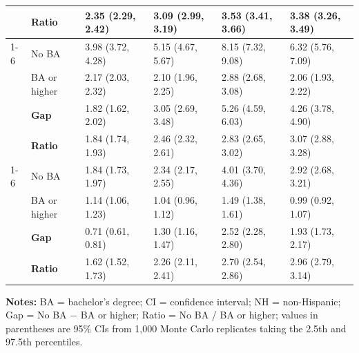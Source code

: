 \begin{threeparttable}
\begin{tabular}{llllll}
 & \textbf{Ratio} & 2.35 (2.29, 2.42) & 3.09 (2.99, 3.19) & 3.53 (3.41, 3.66) & 3.38 (3.26, 3.49) \\
\cmidrule(lr){1-6}
\multirow{4}{*}{NH Black} & No BA & 3.98 (3.72, 4.28) & 5.15 (4.67, 5.67) & 8.15 (7.32, 9.08) & 6.32 (5.76, 7.09) \\
 & BA or higher & 2.17 (2.03, 2.32) & 2.10 (1.96, 2.25) & 2.88 (2.68, 3.08) & 2.06 (1.93, 2.22) \\
 & \textbf{Gap} & 1.82 (1.62, 2.02) & 3.05 (2.69, 3.48) & 5.26 (4.59, 6.03) & 4.26 (3.78, 4.90) \\
 & \textbf{Ratio} & 1.84 (1.74, 1.93) & 2.46 (2.32, 2.61) & 2.83 (2.65, 3.02) & 3.07 (2.88, 3.28) \\
\cmidrule(lr){1-6}
\multirow{4}{*}{Hispanic} & No BA & 1.84 (1.73, 1.97) & 2.34 (2.17, 2.55) & 4.01 (3.70, 4.36) & 2.92 (2.68, 3.21) \\
 & BA or higher & 1.14 (1.06, 1.23) & 1.04 (0.96, 1.12) & 1.49 (1.38, 1.61) & 0.99 (0.92, 1.07) \\
 & \textbf{Gap} & 0.71 (0.61, 0.81) & 1.30 (1.16, 1.47) & 2.52 (2.28, 2.80) & 1.93 (1.73, 2.17) \\
 & \textbf{Ratio} & 1.62 (1.52, 1.73) & 2.26 (2.11, 2.41) & 2.70 (2.54, 2.86) & 2.96 (2.79, 3.14) \\
\bottomrule
\end{tabular}
\begin{tablenotes}[flushleft]
\small
\item \textbf{Notes:} BA = bachelor's degree; CI = confidence interval; NH = non-Hispanic; Gap = No BA $-$ BA or higher; Ratio = No BA / BA or higher; values in parentheses are 95\% CIs from 1,000 Monte Carlo replicates taking the 2.5th and 97.5th percentiles.
\end{tablenotes}
\end{threeparttable}

